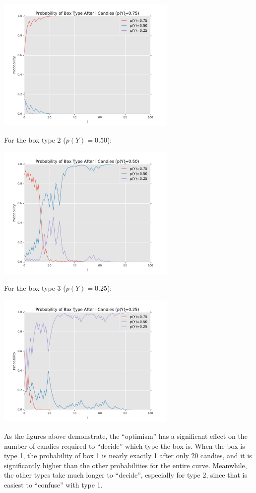 \documentclass[fleqn]{homework}
\begin{document}
\begin{problem}{1}
\begin{enumerate}[1.]
      \includegraphics[width=0.65\textwidth]{p1_part3_0_75.pdf}

      For the box type 2 ($p(Y)=0.50$):

      \includegraphics[width=0.65\textwidth]{p1_part3_0_50.pdf}

      For the box type 3 ($p(Y)=0.25$):

      \includegraphics[width=0.65\textwidth]{p1_part3_0_25.pdf}
    \end{enumerate}

    As the figures above demonstrate, the ``optimism'' has a significant effect
    on the number of candies required to ``decide'' which type the box is.  When
    the box is type 1, the probability of box 1 is nearly exactly 1 after only
    20 candies, and it is significantly higher than the other probabilities for
    the entire curve.  Meanwhile, the other types take much longer to
    ``decide'', especially for type 2, since that is easiest to ``confuse'' with
    type 1.
  \end{problem}
\end{document}
